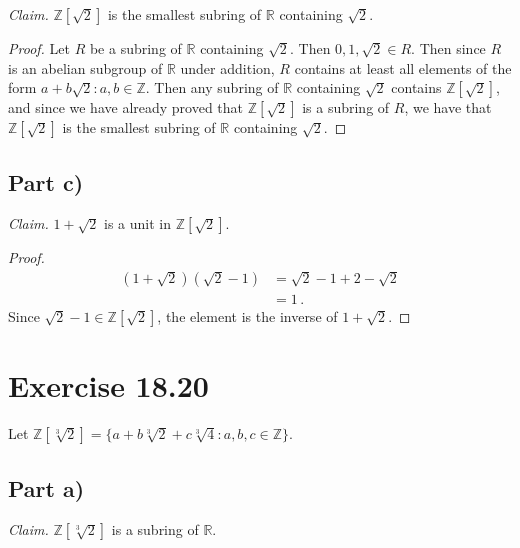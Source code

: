 \documentclass{abrice}
\newcommand{\Z}{\mathbb{Z}}
\newcommand{\R}{\mathbb{R}}
\begin{document}
\emph{Claim.} $\Z[\sqrt 2]$ is the smallest subring of $\R$ containing $\sqrt
2$.

\begin{proof}
  Let $R$ be a subring of $\R$ containing $\sqrt 2$. Then $0,1,\sqrt 2 \in R$.
  Then since $R$ is an abelian subgroup of $\R$ under addition, $R$ contains at
  least all elements of the form $a + b\sqrt2 : a,b \in \Z$. Then any subring of
  $\R$ containing $\sqrt 2$ contains $\Z[\sqrt 2]$, and since we have already
  proved that $\Z[\sqrt 2]$ is a subring of $R$, we have that $\Z[\sqrt 2]$ is
  the smallest subring of $\R$ containing $\sqrt 2$.
\end{proof}

\subsection{Part c)}

\emph{Claim.} $1 + \sqrt 2$ is a unit in $\Z[\sqrt 2]$.

\begin{proof}
  \begin{align*}
    (1 + \sqrt 2)(\sqrt 2 - 1)
    &= \sqrt 2 - 1 + 2 - \sqrt 2 \\
    &= 1\, .
  \end{align*}
  Since $\sqrt 2 - 1 \in \Z[\sqrt 2]$, the element is the inverse of $1 + \sqrt 2$.
\end{proof}

\section{Exercise 18.20}

Let $\Z[\sqrt[3]{2}] = \{ a + b \sqrt[3]{2} + c \sqrt[3]{4} : a,b,c \in \Z \}$.

\subsection{Part a)}

\emph{Claim.} $\Z[\sqrt[3]{2}]$ is a subring of $\R$.
\end{document}
